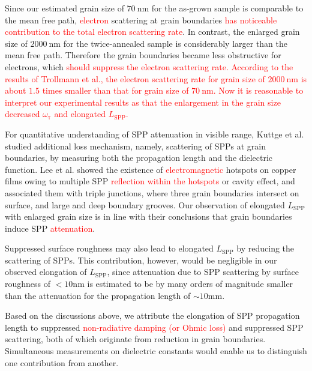 \documentclass[aip,apl,reprint]{revtex4-1}
\begin{document}
Since our estimated grain size of $70\:\mathrm{nm}$ for the as-grown sample is comparable to the mean free path, \textcolor{red}{electron} scattering at grain boundaries \textcolor{red}{has noticeable contribution to the total electron scattering rate}. In contrast, the enlarged grain size of $2000\:\mathrm{nm}$ for the twice-annealed sample is considerably larger than the mean free path. Therefore the grain boundaries became less obstructive for electrons, which \textcolor{red}{should suppress the electron scattering rate. According to the results of Trollmann et al.,\cite{Trollmann} the electron scattering rate for grain size of $2000\:\mathrm{nm}$ is about $1.5$ times smaller than that for grain size of $70\:\mathrm{nm}$. Now it is reasonable to interpret our experimental results as that the enlargement in the grain size decreased $\omega_{\mathrm{\tau}}$ and elongated $L_{\mathrm{SPP}}$.}

\color{black}
For quantitative understanding of SPP attenuation in visible range, Kuttge et al.\cite{Kuttge} studied additional loss mechanism, namely, scattering of SPPs at grain boundaries, by measuring both the propagation length and the dielectric function. 
Lee et al.\cite{Lee} showed the existence of \textcolor{red}{electromagnetic} hotspots on copper films owing to multiple SPP \textcolor{red}{reflection within the hotspots} or cavity effect, and associated them with triple junctions, where three grain boundaries intersect on surface, and large and deep boundary grooves. Our observation of elongated $L_{\mathrm{SPP}}$ with enlarged grain size is in line with their conclusions that grain boundaries induce SPP \textcolor{red}{attenuation}.
 
 
Suppressed surface roughness may also lead to elongated $L_{\mathrm{SPP}}$ by reducing the scattering of SPPs. This contribution, however, would be negligible in our observed elongation of $L_{\mathrm{SPP}}$, since attenuation due to SPP scattering by surface roughness of $<10 \mathrm{nm}$ is estimated to be by many orders of magnitude smaller than the attenuation for the propagation length of $\sim10 \mathrm{mm}$\cite{Shiba, Kuttge, Mills}.

Based on the discussions above, we attribute the elongation of SPP propagation length to suppressed \textcolor{red}{non-radiative damping (or Ohmic loss)} and suppressed SPP scattering, both of which originate from reduction in grain boundaries. Simultaneous measurements on dielectric constants would enable us to distinguish one contribution from another.
\end{document}
